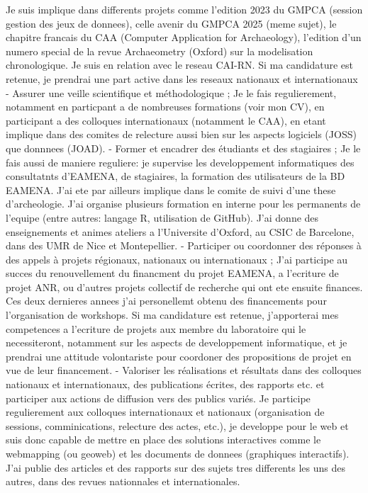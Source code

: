 \documentclass[12pt]{article}
\begin{document}
Je suis implique dans differents projets comme l'edition 2023 du GMPCA (session gestion des jeux de donnees), celle avenir du GMPCA 2025 (meme sujet), le chapitre francais du CAA (Computer Application for Archaeology), l'edition d'un numero special de la revue Archaeometry (Oxford) sur la modelisation chronologique. Je suis en relation avec le reseau CAI-RN. Si ma candidature est retenue, je prendrai une part active dans les reseaux nationaux et internationaux
- Assurer une veille scientifique et méthodologique ;
Je le fais regulierement, notamment en particpant a de nombreuses formations (voir mon CV), en participant a des colloques internationaux (notamment le CAA), en etant implique dans des comites de relecture aussi bien sur les aspects logiciels (JOSS) que donnnees (JOAD).
- Former et encadrer des étudiants et des stagiaires ;
Je le fais aussi de maniere reguliere: je supervise les developpement informatiques des consultatnts d'EAMENA, de stagiaires, la formation des utilisateurs de la BD EAMENA. J'ai ete par ailleurs implique dans le comite de suivi d'une these d'archeologie. J'ai organise plusieurs formation en interne pour les permanents de l'equipe (entre autres: langage R, utilisation de GitHub). J'ai donne des enseignements et animes ateliers a l'Universite d'Oxford, au CSIC de Barcelone, dans des UMR de Nice et Montepellier.
- Participer ou coordonner des réponses à des appels à projets régionaux, nationaux ou internationaux ;
J'ai participe au succes du renouvellement du financment du projet EAMENA, a l'ecriture de projet ANR, ou d'autres projets collectif de recherche qui ont ete ensuite finances. Ces deux dernieres annees j'ai personellemt obtenu des financements pour l'organisation de workshops. Si ma candidature est retenue, j'apporterai mes competences a l'ecriture de projets aux membre du laboratoire qui le necessiteront, notamment sur les aspects de developpement informatique, et je prendrai une attitude volontariste pour coordoner des propositions de projet en vue de leur financement. 
- Valoriser les réalisations et résultats dans des colloques nationaux et internationaux, des publications écrites, des rapports etc. et participer aux actions de diffusion vers des publics variés.
Je participe regulierement aux colloques internationaux et nationaux (organisation de sessions, comminications, relecture des actes, etc.), je developpe pour le web et suis donc capable de mettre en place des solutions interactives comme le webmapping (ou geoweb) et les documents de donnees (graphiques interactifs). J'ai publie des articles et des rapports sur des sujets tres differents les uns des autres, dans des revues nationnales et internationales. 
\end{document}
